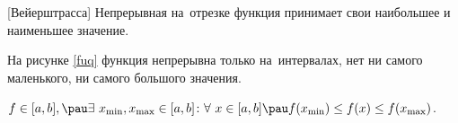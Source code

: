 [Вейерштрасса]\label{vmaxmin} Непрерывная на~отрезке функция принимает свои наибольшее и наименьшее значение.


На рисунке \ref{fuq} функция непрерывна только на~интервалах, нет
  ни самого маленького, ни самого большого значения.

$f\in[a,b],\pau \exists\  x_{\min},x_{\max}\in[a,b]\colon
\forall\  x\in[a,b]\pau f(x_{\min})\leq f(x)\leq f(x_{\max})$.
